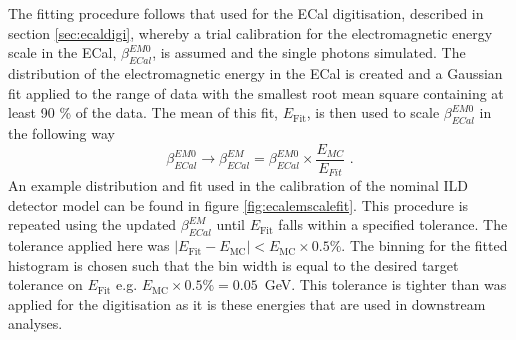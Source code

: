 The fitting procedure follows that used for the ECal digitisation, described in section \ref{sec:ecaldigi}, whereby a trial calibration for the electromagnetic energy scale in the ECal, $\beta^{EM0}_{ECal}$, is assumed and the single photons simulated.  The distribution of the electromagnetic energy in the ECal is created and a Gaussian fit applied to the range of data with the smallest root mean square containing at least 90 \% of the data.  The mean of this fit, $E_{\text{Fit}}$, is then used to scale $\beta^{EM0}_{ECal}$ in the following way
%
\begin{equation}
\beta^{EM0}_{ECal} \rightarrow \beta^{EM}_{ECal} = \beta^{EM0}_{ECal} \times \frac{E_{MC}}{E_{Fit}}\text{ .}
\end{equation}
%
An example distribution and fit used in the calibration of the nominal ILD detector model can be found in figure \ref{fig:ecalemscalefit}.  This procedure is repeated using the updated $\beta^{EM}_{ECal}$ until $E_{\text{Fit}}$ falls within a specified tolerance.  The tolerance applied here was $|E_{\text{Fit}} - E_{\text{MC}}| < E_{\text{MC}} \times 0.5 \%$.  The binning for the fitted histogram is chosen such that the bin width is equal to the desired target tolerance on $E_{\text{Fit}}$ e.g. $E_{\text{MC}} \times 0.5 \% = 0.05$~GeV.  This tolerance is tighter than was applied for the digitisation as it is these energies that are used in downstream analyses.   
 

